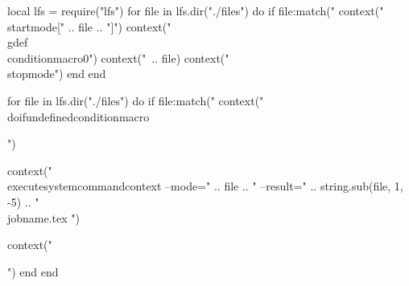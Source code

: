 \startluacode
local lfs = require("lfs")
for file in lfs.dir("./files") do
	if file:match("%
		context("\\startmode[" .. file .. "]")
		context("\\gdef\\conditionmacro{0}")
		context("\ .. file)
		context("\\stopmode")
	end
end

for file in lfs.dir("./files") do
	if file:match("%
		context("\\doifundefined{conditionmacro}{")

		context("\\executesystemcommand{context --mode=" .. file .. " --result=" .. string.sub(file, 1, -5) .. " \\jobname.tex }")

		context("}")
	end
end
\stopluacode


